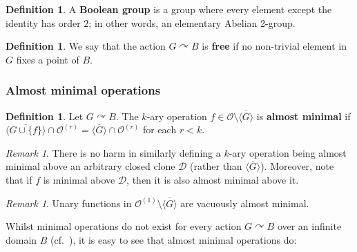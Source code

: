 \documentclass{article}
\theoremstyle{remark}
\newtheorem{remark}[theorem]{Remark}
\theoremstyle{definition}
\newtheorem{definition}[theorem]{Definition}
\def\acts{\curvearrowright}
\begin{document}
\begin{definition} A \textbf{Boolean group} is a group where every element except the identity has order $2$; in other words, an elementary Abelian 2-group.
\end{definition}

\begin{definition} We say that the action $G\acts B$ is \textbf{free} if no non-trivial element in $G$ fixes a point of $B$.
\end{definition}

\subsubsection{Almost minimal operations}

\begin{definition}\label{def:almostmin} Let $G\acts B$. The $k$-ary operation $f\in\mathcal{O}\setminus\overline{\langle G\rangle}$ is \textbf{almost minimal} if $\overline{\langle G \cup\{f\}\rangle}\cap \mathcal{O}^{(r)}=\overline{\langle G\rangle}\cap \mathcal{O}^{(r)}$ for each $r<k$. 
\end{definition}

\begin{remark} There is no harm in similarly defining a $k$-ary operation being almost minimal above an arbitrary closed clone $\mathcal{D}$ (rather than $\overline{\langle G\rangle}$). Moreover, note that if $f$ is minimal above $\mathcal{D}$, then it is also almost minimal above it. 
\end{remark}

\begin{remark}\label{alwaysunary} Unary functions in $\mathcal{O}^{(1)}\setminus \overline{\langle G\rangle}$ are vacuously almost minimal.  
\end{remark}

Whilst minimal operations do not  exist for every action $G\acts B$ over an infinite domain $B$ (cf.~\cite{csakany2005minimal}), it is easy to see that almost minimal operations do:
\end{document}
